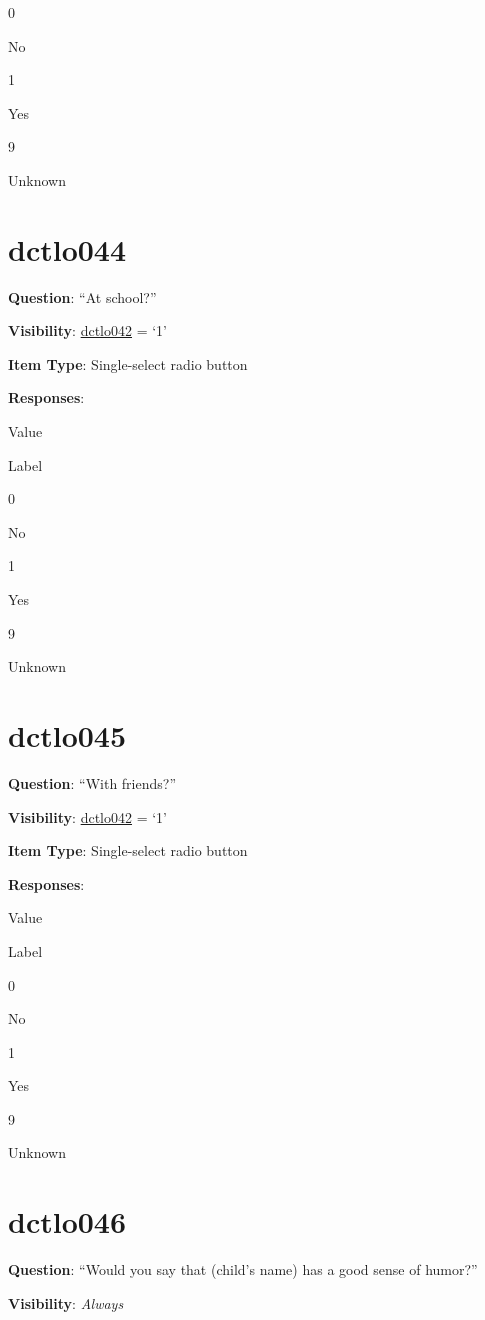 \documentclass[]{book}
\begin{document}
0

No

1

Yes

9

Unknown

\hypertarget{dctlo044}{%
\section{dctlo044}\label{dctlo044}}

\textbf{Question}: ``At school?''

\textbf{Visibility}: \protect\hyperlink{dctlo042}{dctlo042} = `1'

\textbf{Item Type}: Single-select radio button

\textbf{Responses}:

Value

Label

0

No

1

Yes

9

Unknown

\hypertarget{dctlo045}{%
\section{dctlo045}\label{dctlo045}}

\textbf{Question}: ``With friends?''

\textbf{Visibility}: \protect\hyperlink{dctlo042}{dctlo042} = `1'

\textbf{Item Type}: Single-select radio button

\textbf{Responses}:

Value

Label

0

No

1

Yes

9

Unknown

\hypertarget{dctlo046}{%
\section{dctlo046}\label{dctlo046}}

\textbf{Question}: ``Would you say that (child's name) has a good sense of humor?''

\textbf{Visibility}: \emph{Always}
\end{document}
